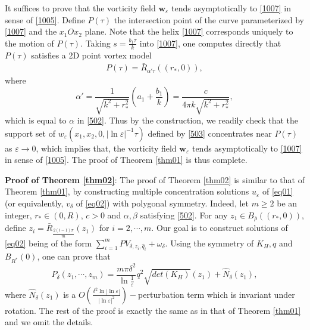 \documentclass[12pt,reqno]{amsart}
\numberwithin{equation}{section}
\theoremstyle{definition}
\theoremstyle{remark}
\begin{document}
It suffices to prove that the vorticity field $ \mathbf{w}_\varepsilon $ tends asymptotically to \eqref{1007} in sense of \eqref{1005}.  Define $ P(\tau) $ the intersection point of the curve  parameterized by \eqref{1007} and the $ x_1Ox_2 $ plane. Note that the helix \eqref{1007} corresponds uniquely to the motion of $ P(\tau) $. Taking $ s=\frac{b_1\tau}{k} $ into \eqref{1007}, one computes directly that  $ P(\tau) $ satisfies a 2D point vortex model
\begin{equation*}
\begin{split}
P(\tau)=\bar{R}_{\alpha'\tau}((r_*,0)),
\end{split}
\end{equation*}
where
\begin{equation*}
\alpha'=\frac{1}{\sqrt{k^2+r_*^2}}\left( a_1+\frac{b_1}{k}\right)=\frac{c}{4\pi k\sqrt{k^2+r_*^2}},
\end{equation*}
which is equal to $ \alpha $ in \eqref{502}. Thus by the construction, we  readily check that the support set of $ w_\varepsilon(x_1,x_2,0,|\ln\varepsilon|^{-1}\tau) $ defined by  \eqref{503} concentrates near $ P(\tau) $ as $ \varepsilon\to 0 $, which implies that, the vorticity field $ \mathbf{w}_\varepsilon $ tends asymptotically to \eqref{1007} in sense of \eqref{1005}.
The proof of Theorem \ref{thm01} is thus complete.

\textbf{Proof of Theorem \ref{thm02}}: The proof of Theorem \ref{thm02} is similar to that of Theorem \ref{thm01}, by constructing multiple concentration solutions $ u_\varepsilon $ of \eqref{eq01} (or equivalently, $ v_\delta $ of \eqref{eq02}) with polygonal symmetry. Indeed, let $ m\geq2 $ be an integer, $ r_*\in (0,R) $, $ c>0 $ and $ \alpha,\beta $ satisfying \eqref{502}. For any $ z_1\in B_{\bar{\rho}}((r_*,0)) $, define $ z_i=\bar{R}_{\frac{2(i-1)\pi}{m}}(z_1) $ for $ i=2,\cdots,m. $ Our goal is to construct solutions of \eqref{eq02} being of the form $  \sum_{i=1}^mPV_{\delta,z_i,\hat{q}_i}+\omega_{\delta} $. Using the symmetry of $ K_H, q $ and $ B_{R^*}(0) $, one can  prove that
\begin{equation*}
P_\delta(z_1,\cdots,z_m)=\frac{m\pi\delta^2}{\ln\frac{1}{\varepsilon}}q^2\sqrt{det(K_H)}(z_1)+\hat{N}_\delta(z_1),
\end{equation*}
where $ \hat{N}_\delta(z_1) $ is a $ O\left( \frac{\delta^2\ln|\ln\varepsilon|}{|\ln\varepsilon|^2}\right)  -$perturbation term which is invariant under rotation. The rest of the proof is exactly the same as
in that of Theorem \ref{thm01} and we omit the details.
\end{document}
